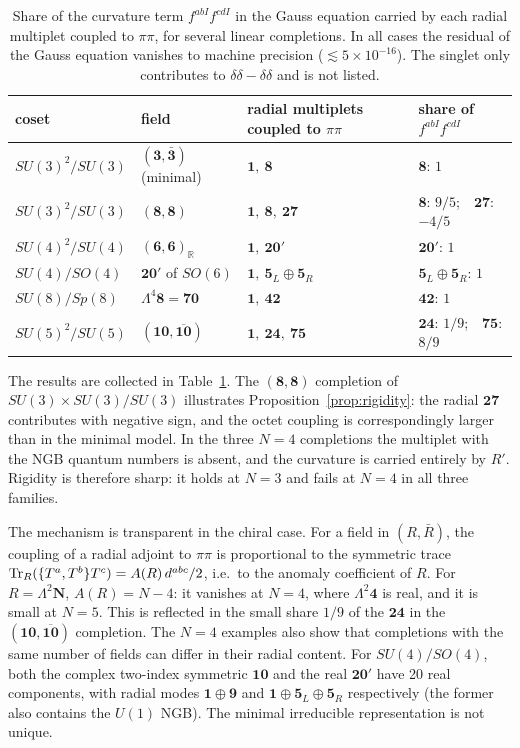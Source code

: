 \begin{table}[t]
\caption{Share of the curvature term $f^{abI}f^{cdI}$ in the Gauss equation carried by each radial multiplet coupled to $\pi\pi$, for several linear completions. In all cases the residual of the Gauss equation vanishes to machine precision ($\lesssim5\times10^{-16}$). The singlet only contributes to $\delta\delta-\delta\delta$ and is not listed.}
\label{tab:shares}
\begin{ruledtabular}
\begin{tabular}{llll}
coset & field & radial multiplets coupled to $\pi\pi$ & share of $f^{abI}f^{cdI}$\\
\hline
$SU(3)^2/SU(3)$ & $(\mathbf3,\bar{\mathbf3})$ (minimal) & $\mathbf1,\ \mathbf8$ & $\mathbf8$: $1$\\
$SU(3)^2/SU(3)$ & $(\mathbf8,\mathbf8)$ & $\mathbf1,\ \mathbf8,\ \mathbf{27}$ & $\mathbf8$: $9/5$;\ \ $\mathbf{27}$: $-4/5$\\
$SU(4)^2/SU(4)$ & $(\mathbf6,\mathbf6)_{\mathbb R}$ & $\mathbf1,\ \mathbf{20}'$ & $\mathbf{20}'$: $1$\\
$SU(4)/SO(4)$ & $\mathbf{20}'$ of $SO(6)$ & $\mathbf1,\ \mathbf5_L\oplus\mathbf5_R$ & $\mathbf5_L\oplus\mathbf5_R$: $1$\\
$SU(8)/Sp(8)$ & $\Lambda^4\mathbf8=\mathbf{70}$ & $\mathbf1,\ \mathbf{42}$ & $\mathbf{42}$: $1$\\
$SU(5)^2/SU(5)$ & $(\mathbf{10},\overline{\mathbf{10}})$ & $\mathbf1,\ \mathbf{24},\ \mathbf{75}$ & $\mathbf{24}$: $1/9$;\ \ $\mathbf{75}$: $8/9$
\end{tabular}
\end{ruledtabular}
\end{table}

The results are collected in Table~\ref{tab:shares}. The $(\mathbf8,\mathbf8)$ completion of $SU(3)\times SU(3)/SU(3)$ illustrates Proposition~\ref{prop:rigidity}: the radial $\mathbf{27}$ contributes with negative sign, and the octet coupling is correspondingly larger than in the minimal model. In the three $N=4$ completions the multiplet with the NGB quantum numbers is absent, and the curvature is carried entirely by $R'$. Rigidity is therefore sharp: it holds at $N=3$ and fails at $N=4$ in all three families.

The mechanism is transparent in the chiral case. For a field in $(R,\bar R)$, the coupling of a radial adjoint to $\pi\pi$ is proportional to the symmetric trace $\mathrm{Tr}_R(\{T^a,T^b\}T^c)=A(R)\,d^{abc}/2$, i.e.\ to the anomaly coefficient of $R$. For $R=\Lambda^2\mathbf N$, $A(R)=N-4$: it vanishes at $N=4$, where $\Lambda^2\mathbf4$ is real, and it is small at $N=5$. This is reflected in the small share $1/9$ of the $\mathbf{24}$ in the $(\mathbf{10},\overline{\mathbf{10}})$ completion. The $N=4$ examples also show that completions with the same number of fields can differ in their radial content. For $SU(4)/SO(4)$, both the complex two-index symmetric $\mathbf{10}$ and the real $\mathbf{20}'$ have 20 real components, with radial modes $\mathbf1\oplus\mathbf9$ and $\mathbf1\oplus\mathbf5_L\oplus\mathbf5_R$ respectively (the former also contains the $U(1)$ NGB). The minimal irreducible representation is not unique.

